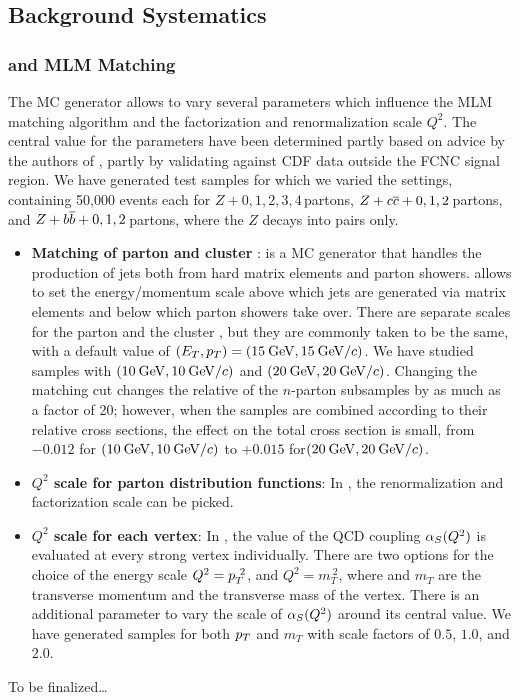 
\subsection{Background Systematics}

\subsubsection{\alp and MLM Matching}

The \alp MC generator allows to vary several parameters which
influence the MLM matching algorithm and the factorization and
renormalization scale $Q^2$. The central value for the parameters have
been determined partly based on advice by the authors of \alp, partly
by validating \alp against CDF data outside the FCNC signal region. We
have generated test samples for which we varied the \alp settings,
containing 50,000 events each for $Z+0,1,2,3,4$\,partons,
$Z+{c\overline{c}}+0,1,2$\,partons, and $Z+{b\overline{b}}+0,1,2$\,partons, where the
$Z$ decays into \mm pairs only.


\begin{itemize}
\item{\bf Matching of parton \pt and cluster \et}: \alp is a MC
  generator that handles the production of jets both from hard matrix
  elements and \pyth parton showers. \alp allows to set the
  energy/momentum scale above which jets are generated via matrix
  elements and below which parton showers take over. There are
  separate scales for the parton \pt and the cluster \et, but they are
  commonly taken to be the same, with a default value of
  $(E_{T},p_{T})=(15\:\mathrm{GeV},15\:\mathrm{GeV}/c)$. We have studied samples with
  $(10\:\mathrm{GeV},10\:\mathrm{GeV}/c)$ and $(20\:\mathrm{GeV},20\:\mathrm{GeV}/c)$. Changing the matching cut
  changes the relative \xsects of the $n$-parton subsamples by as much
  as a factor of 20; however, when the samples are combined according
  to their relative cross sections, the effect on the total cross
  section is small, from $-0.012$ for $(10\:\mathrm{GeV},10\:\mathrm{GeV}/c)$ to $+0.015$
  for$(20\:\mathrm{GeV},20\:\mathrm{GeV}/c)$. 
\item {\bf \boldmath $Q^{2}$ \unboldmath scale for parton distribution
    functions}: In \alp, the renormalization and factorization scale
  can be picked.
\item {\bf \boldmath $Q^{2}$ \unboldmath scale for each vertex}: In
  \alp, the value of the QCD coupling $\alpha_{S}(Q^2)$ is evaluated at
  every strong vertex individually. There are two options for the
  choice of the energy scale $Q^2=p_{T}^{~2}$, and $Q^2=m_T^{~2}$, where
  \pt and $m_T$ are the transverse momentum and the transverse mass of
  the vertex. There is an additional parameter to vary the scale of
  $\alpha_{S}(Q^2)$ around its central value. We have generated samples
  for both $p_{T}$ and $m_T$ with scale factors of $0.5$, $1.0$, and
  $2.0$. 
\end{itemize}
To be finalized\dots

